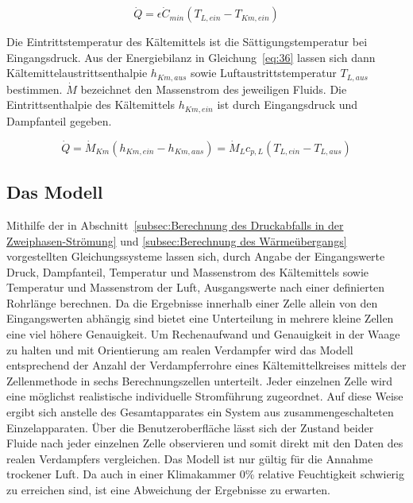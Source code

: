 \begin{equation}
\label{eq:35}
\dot{Q} = \epsilon \dot{C}_{min} (T_{L,ein} - T_{Km,ein})
\end{equation}

Die Eintrittstemperatur des Kältemittels ist die Sättigungstemperatur bei Eingangsdruck. Aus der Energiebilanz in Gleichung~\ref{eq:36} lassen sich dann Kältemittelaustrittsenthalpie $h_{Km,aus}$ sowie Luftaustrittstemperatur $T_{L,aus}$ bestimmen. $\dot{M}$ bezeichnet den Massenstrom des jeweiligen Fluids. Die Eintrittsenthalpie des Kältemittels $h_{Km,ein}$ ist durch Eingangsdruck und Dampfanteil gegeben.

\begin{equation}
\label{eq:36}
\dot{Q} = \dot{M}_{Km} (h_{Km,ein} - h_{Km,aus}) = \dot{M}_{L} c_{p,L}(T_{L,ein} - T_{L,aus})
\end{equation}





\subsection{Das Modell}
\label{subsec:Das Modell}

Mithilfe der in Abschnitt~\ref{subsec:Berechnung des Druckabfalls in der Zweiphasen-Strömung} und \ref{subsec:Berechnung des Wärmeübergangs} vorgestellten Gleichungssysteme lassen sich, durch Angabe der Eingangswerte Druck, Dampfanteil, Temperatur und Massenstrom des Kältemittels sowie Temperatur und Massenstrom der Luft, Ausgangswerte nach einer definierten Rohrlänge berechnen. Da die Ergebnisse innerhalb einer Zelle allein von den Eingangswerten abhängig sind bietet eine Unterteilung in mehrere kleine Zellen eine viel höhere Genauigkeit. Um Rechenaufwand und Genauigkeit in der Waage zu halten und mit Orientierung am realen Verdampfer wird das Modell entsprechend der Anzahl der Verdampferrohre eines Kältemittelkreises mittels der Zellenmethode in sechs Berechnungszellen unterteilt\cite{LehrstuhlfurWarmeundStoffubertragung.b}. Jeder einzelnen Zelle wird eine möglichst realistische individuelle Stromführung zugeordnet. Auf diese Weise ergibt sich anstelle des Gesamtapparates ein System aus zusammengeschalteten Einzelapparaten\cite{SpringerVerlagGmbH.2013}.
Über die Benutzeroberfläche lässt sich der Zustand beider Fluide nach jeder einzelnen Zelle observieren und somit direkt mit den Daten des realen Verdampfers vergleichen.
Das Modell ist nur gültig für die Annahme trockener Luft. Da auch in einer Klimakammer \unit{0}{\%} relative Feuchtigkeit schwierig zu erreichen sind, ist eine Abweichung der Ergebnisse zu erwarten.




